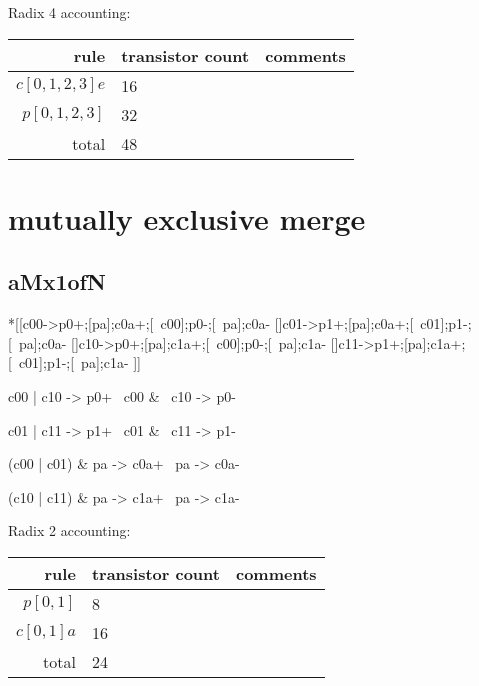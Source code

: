 \documentclass{article}
\begin{document}
\noindent Radix 4 accounting: 

\begin{center}
    \begin{tabular}{|r|l|l|}
    \hline
    rule & transistor count & comments \\ \hline
    $c[0,1,2,3]e$ & 16 & \\ \hline
    $p[0,1,2,3]$ & 32 & \\ \hline
    \hline total & 48 & \\ \hline
    \end{tabular}
\end{center}

\section{mutually exclusive merge}

\subsection{aMx1ofN}

\begin{hse}
*[[c00->p0+;[pa];c0a+;[~c00];p0-;[~pa];c0a-
  []c01->p1+;[pa];c0a+;[~c01];p1-;[~pa];c0a-
  []c10->p0+;[pa];c1a+;[~c00];p0-;[~pa];c1a-
  []c11->p1+;[pa];c1a+;[~c01];p1-;[~pa];c1a-
 ]]
\end{hse}

\begin{prs2}
c00 | c10 -> p0+
~c00 & ~c10 -> p0-

c01 | c11 -> p1+
~c01 & ~c11 -> p1-
\end{prs2}

\begin{prs2}
(c00 | c01) & pa -> c0a+
~pa -> c0a-

(c10 | c11) & pa -> c1a+
~pa -> c1a-
\end{prs2}

\noindent Radix 2 accounting: 

\begin{center}
    \begin{tabular}{|r|l|l|}
    \hline
    rule & transistor count & comments \\ \hline
    $p[0,1]$ & 8 & \\ \hline
    $c[0,1]a$ & 16 & \\ \hline
    \hline total & 24 & \\ \hline
    \end{tabular}
\end{center}
\end{document}
